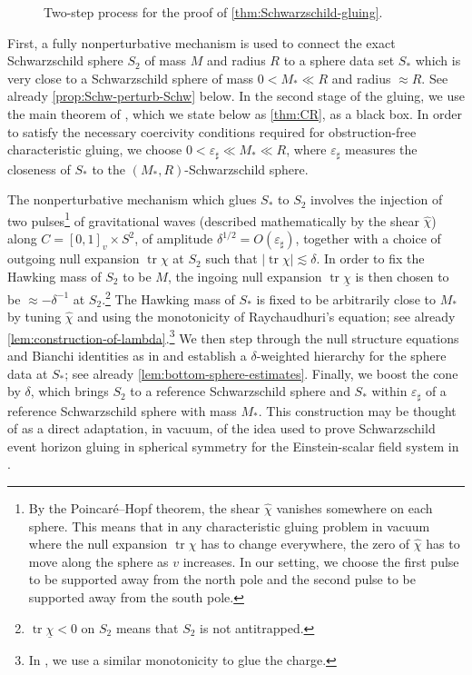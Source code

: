 \documentclass[10pt]{article}
\numberwithin{equation}{section}
\theoremstyle{plain}
\theoremstyle{definition}
\newcommand{\ve}{\varepsilon}
\newcommand{\les}{\lesssim}
\newcommand{\tr}{\operatorname{tr}}
\begin{document}
 \begin{figure}[ht]
\centering{
\def\svgwidth{13pc}
}
\caption{Two-step process for the proof of \cref{thm:Schwarzschild-gluing}.}
\label{fig:two-phases}
\end{figure}

First, a fully nonperturbative mechanism is used to connect the exact Schwarzschild sphere $S_2$ of mass $M$ and radius $R$ to a sphere data set $S_*$ which is very close to a Schwarzschild sphere of mass $0<M_* \ll R$ and radius $\approx R$. See already \cref{prop:Schw-perturb-Schw} below. In the second stage of the gluing, we use the main theorem of \cite{Czimek2022-cl}, which we state below as \cref{thm:CR}, as a black box. In order to satisfy the necessary coercivity conditions required for obstruction-free characteristic gluing, we choose $0< \ve_\sharp\ll M_*\ll R$, where $\ve_\sharp$ measures the closeness of $S_*$ to the $(M_*,R)$-Schwarzschild sphere. 

The nonperturbative mechanism which glues $S_*$ to $S_2$ involves the injection of two pulses\footnote{By the Poincar\'e--Hopf theorem, the shear $\hat\chi$ vanishes somewhere on each sphere. This means that in any characteristic gluing problem in vacuum where the null expansion $\tr\chi$ has to change everywhere, the zero of $\hat\chi$ has to move along the sphere as $v$ increases. In our setting, we choose the first pulse to be supported away from the north pole and the second pulse to be supported away from the south pole.} of gravitational waves (described mathematically by the shear $\hat\chi$) along $C=[0,1]_v\times S^2$, of amplitude $\delta^{1/2}=O(\ve_\sharp)$, together with a choice of outgoing null expansion $\tr\chi$ at $S_2$ such that $|\!\tr\chi|\les \delta$. In order to fix the Hawking mass of $S_2$ to be $M$, the ingoing null expansion $\tr\underline\chi$ is then chosen to be $\approx -\delta^{-1}$ at $S_2$.\footnote{$\tr\underline\chi<0$ on $S_2$ means that $S_2$ is not antitrapped.} The Hawking mass of $S_*$ is fixed to be arbitrarily close to $M_*$ by tuning $\hat\chi$ and using the monotonicity of Raychaudhuri's equation; see already \cref{lem:construction-of-lambda}.\footnote{In \cite{KU22}, we use a similar monotonicity to glue the charge.}  We then step through the null structure equations and Bianchi identities as in \cite[Chapter 2]{Christo09} and establish a $\delta$-weighted hierarchy for the sphere data at $S_*$; see already \cref{lem:bottom-sphere-estimates}. Finally, we boost the cone by $\delta$, which brings $S_2$ to a reference Schwarzschild sphere and $S_*$ within $\ve_\sharp$ of a reference Schwarzschild sphere with mass $M_*$. This construction may be thought of as a direct adaptation, in vacuum, of the idea used to prove Schwarzschild event horizon gluing in spherical symmetry for the Einstein-scalar field system in \cite[Section 4.1]{KU22}.
\end{document}
